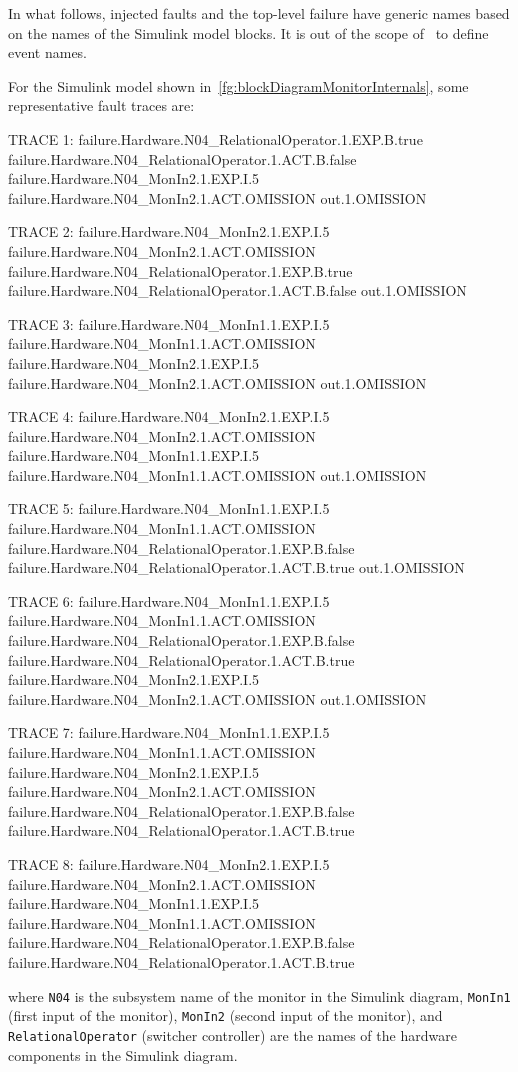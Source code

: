 \documentclass[en,twoside,onehalfspacing,phd]{risethesis}
\newenvironment{snippetcspm}[1][2]
{
\ifthenelse{\equal{#1}{0}}
    {\tiny}
    {
    \ifthenelse{\equal{#1}{1}}
        {\scriptsize}
        {
        \ifthenelse{\equal{#1}{2}}
            {\footnotesize}
            {\small}
        }
    }
\verbatim
}
{
\endverbatim
}
\newcommand{\simulink}{Simulink\xspace}
\begin{document}
In what follows, injected faults and the top-level failure have generic names based on the names of the \simulink model blocks.
It is out of the scope of~\cite{DM2012} to define event names.

For the \simulink model shown in~\cref{fg:blockDiagramMonitorInternals}, some representative fault traces are:

\begin{snippetcspm}[1]
TRACE 1:
failure.Hardware.N04_RelationalOperator.1.EXP.B.true
failure.Hardware.N04_RelationalOperator.1.ACT.B.false
failure.Hardware.N04_MonIn2.1.EXP.I.5
failure.Hardware.N04_MonIn2.1.ACT.OMISSION
out.1.OMISSION

TRACE 2:
failure.Hardware.N04_MonIn2.1.EXP.I.5
failure.Hardware.N04_MonIn2.1.ACT.OMISSION
failure.Hardware.N04_RelationalOperator.1.EXP.B.true
failure.Hardware.N04_RelationalOperator.1.ACT.B.false
out.1.OMISSION

TRACE 3:
failure.Hardware.N04_MonIn1.1.EXP.I.5
failure.Hardware.N04_MonIn1.1.ACT.OMISSION
failure.Hardware.N04_MonIn2.1.EXP.I.5
failure.Hardware.N04_MonIn2.1.ACT.OMISSION
out.1.OMISSION

TRACE 4:
failure.Hardware.N04_MonIn2.1.EXP.I.5
failure.Hardware.N04_MonIn2.1.ACT.OMISSION
failure.Hardware.N04_MonIn1.1.EXP.I.5
failure.Hardware.N04_MonIn1.1.ACT.OMISSION
out.1.OMISSION

TRACE 5:
failure.Hardware.N04_MonIn1.1.EXP.I.5
failure.Hardware.N04_MonIn1.1.ACT.OMISSION
failure.Hardware.N04_RelationalOperator.1.EXP.B.false
failure.Hardware.N04_RelationalOperator.1.ACT.B.true
out.1.OMISSION

TRACE 6:
failure.Hardware.N04_MonIn1.1.EXP.I.5
failure.Hardware.N04_MonIn1.1.ACT.OMISSION
failure.Hardware.N04_RelationalOperator.1.EXP.B.false
failure.Hardware.N04_RelationalOperator.1.ACT.B.true
failure.Hardware.N04_MonIn2.1.EXP.I.5
failure.Hardware.N04_MonIn2.1.ACT.OMISSION
out.1.OMISSION

TRACE 7:
failure.Hardware.N04_MonIn1.1.EXP.I.5
failure.Hardware.N04_MonIn1.1.ACT.OMISSION
failure.Hardware.N04_MonIn2.1.EXP.I.5
failure.Hardware.N04_MonIn2.1.ACT.OMISSION
failure.Hardware.N04_RelationalOperator.1.EXP.B.false
failure.Hardware.N04_RelationalOperator.1.ACT.B.true

TRACE 8:
failure.Hardware.N04_MonIn2.1.EXP.I.5
failure.Hardware.N04_MonIn2.1.ACT.OMISSION
failure.Hardware.N04_MonIn1.1.EXP.I.5
failure.Hardware.N04_MonIn1.1.ACT.OMISSION
failure.Hardware.N04_RelationalOperator.1.EXP.B.false
failure.Hardware.N04_RelationalOperator.1.ACT.B.true
\end{snippetcspm}
%
where \verb$N04$ is the subsystem name of the monitor in the \simulink diagram, \verb$MonIn1$ (first input of the monitor), \verb$MonIn2$ (second input of the monitor), and \verb$RelationalOperator$ (switcher controller) are the names of the hardware components in the \simulink diagram.
\end{document}
